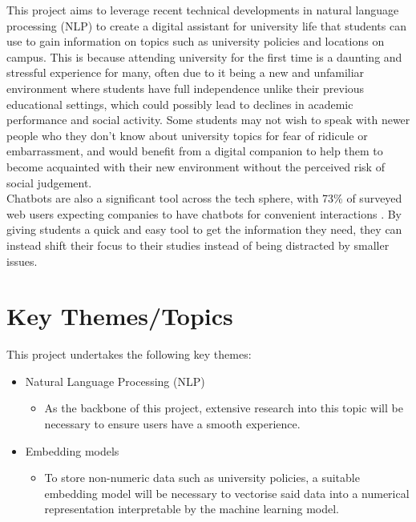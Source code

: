 \documentclass[12pt]{report}
\begin{document}
    \noindent This project aims to leverage recent technical developments in natural language processing (NLP)
    to create a digital assistant for university life that students can use to gain information on topics
    such as university policies and locations on campus. This is because attending university for the first time
    is a daunting and stressful experience for many, often due to it being a new and unfamiliar environment 
    where students have full independence unlike their previous educational settings, which could possibly 
    lead to declines in academic performance and social activity. Some students may not 
    wish to speak with newer people who they don't know about university topics for fear of 
    ridicule or embarrassment, and would benefit from a digital companion to help them to become 
    acquainted with their new environment without the perceived risk of social judgement.\\

    \noindent Chatbots are also a significant tool across the tech sphere, with 73\% of surveyed web users expecting
    companies to have chatbots for convenient interactions \autocite{chatbotStats}. By giving students a 
    quick and easy tool to get the information they need, they can instead shift their focus to their studies
    instead of being distracted by smaller issues.

    

    \section{Key Themes/Topics}
    This project undertakes the following key themes:

    \begin{itemize}
        \item Natural Language Processing (NLP) 
            \begin{itemize}
                \item As the backbone of this project, extensive research into this topic will be necessary 
                to ensure users have a smooth experience.
            \end{itemize}
        \item Embedding models
            \begin{itemize}
                \item To store non-numeric data such as university policies, a suitable embedding model
                will be necessary to vectorise said data into a numerical representation interpretable by
                the machine learning model.
            \end{itemize}
    \end{itemize}
\end{document}
